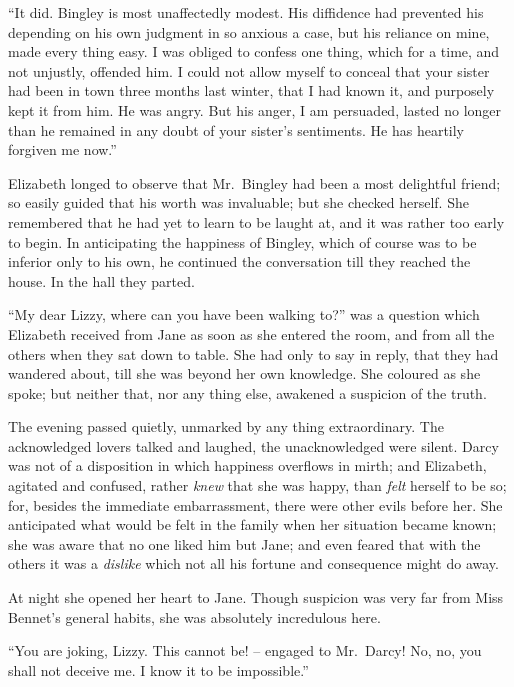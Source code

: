“It did. Bingley is most unaffectedly modest. His
diffidence had prevented his depending on his own judgment
in so anxious a case, but his reliance on mine, made
every thing easy. I was obliged to confess one thing,
which for a time, and not unjustly, offended him. I could
not allow myself to conceal that your sister had been in
town three months last winter, that I had known it, and
purposely kept it from him. He was angry. But his
anger, I am persuaded, lasted no longer than he remained
in any doubt of your sister’s sentiments. He has heartily
forgiven me now.”

Elizabeth longed to observe that Mr.\ Bingley had been
a most delightful friend; so easily guided that his worth
was invaluable; but she checked herself. She remembered
that he had yet to learn to be laught at, and it
was rather too early to begin. In anticipating the happiness
of Bingley, which of course was to be inferior only
to his own, he continued the conversation till they reached
the house. In the hall they parted.


“My dear Lizzy, where can you have been walking
to?” was a question which Elizabeth received from Jane
as soon as she entered the room, and from all the others
when they sat down to table. She had only to say in
reply, that they had wandered about, till she was beyond
her own knowledge. She coloured as she spoke; but
neither that, nor any thing else, awakened a suspicion of
the truth.

The evening passed quietly, unmarked by any thing
extraordinary. The acknowledged lovers tal\-ked and
laughed, the unacknowledged were silent. Darcy was not
of a disposition in which happiness overflows in mirth;
and Elizabeth, agitated and confused, rather \textit{knew} that
she was happy, than \textit{felt} herself to be so; for, besides the
immediate embarrassment, there were other evils before
her. She anticipated what would be felt in the family when
her situation became known; she was aware that no one
liked him but Jane; and even feared that with the others
it was a \textit{dislike} which not all his fortune and consequence
might do away.

At night she opened her heart to Jane. Though suspicion
was very far from Miss Bennet’s general habits, she
was absolutely incredulous here.

“You are joking, Lizzy. This cannot be! -- engaged to
Mr.\ Darcy! No, no, you shall not deceive me. I know
it to be impossible.”

